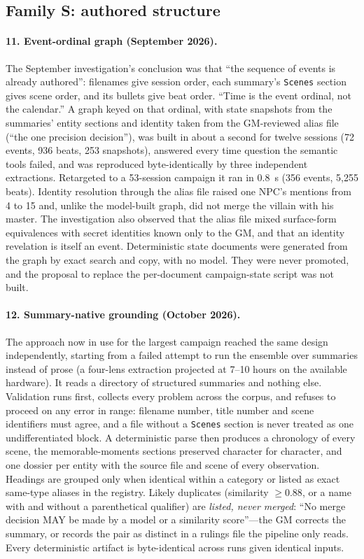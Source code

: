 \documentclass[11pt]{article}
\begin{document}
\subsection{Family S: authored structure}

\paragraph{11. Event-ordinal graph (September 2026).}
The September investigation's conclusion was that ``the sequence of events is already authored'':
filenames give session order, each summary's \texttt{Scenes} section gives scene order, and its bullets
give beat order. ``Time is the event ordinal, not the calendar.'' A graph keyed on that ordinal, with
state snapshots from the summaries' entity sections and identity taken from the GM-reviewed alias file
(``the one precision decision''), was built in about a second for twelve sessions (72 events, 936 beats,
253 snapshots), answered every time question the semantic tools failed, and was reproduced
byte-identically by three independent extractions. Retargeted to a 53-session campaign it ran in
0.8~s (356 events, 5{,}255 beats). Identity resolution through the alias file raised one NPC's
mentions from 4 to 15 and, unlike the model-built graph, did not merge the villain with his master.
The investigation also observed that the alias file mixed surface-form equivalences with secret
identities known only to the GM, and that an identity revelation is itself an event. Deterministic
state documents were generated from the graph by exact search and copy, with no model. They were
never promoted, and the proposal to replace the per-document campaign-state script was not built.

\paragraph{12. Summary-native grounding (October 2026).}
The approach now in use for the largest campaign reached the same design independently, starting from a
failed attempt to run the ensemble over summaries instead of prose (a four-lens extraction projected at
7--10 hours on the available hardware). It reads a directory of structured summaries and nothing else.
Validation runs first, collects every problem across the corpus, and refuses to proceed on any error in
range: filename number, title number and scene identifiers must agree, and a file without a
\texttt{Scenes} section is never treated as one undifferentiated block. A deterministic parse then
produces a chronology of every scene, the memorable-moments sections preserved character for
character, and one dossier per entity with the source file and scene of every observation. Headings
are grouped only when identical within a category or listed as exact same-type aliases in the
registry. Likely duplicates (similarity $\ge 0.88$, or a name with and without a parenthetical
qualifier) are \emph{listed, never merged}: ``No merge decision MAY be made by a model or a similarity
score''---the GM corrects the summary, or records the pair as distinct in a rulings file the pipeline
only reads. Every deterministic artifact is byte-identical across runs given identical inputs.
\end{document}

